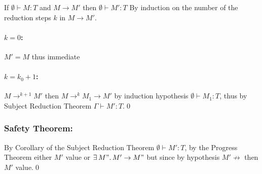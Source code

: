 If $\emptyset \vdash M: T$ and $M \to M'$ then $\emptyset \vdash M': T$
By induction on the number of the reduction steps $k$ in $M \to M'$.

\paragraph*{$k = 0$:} $M' = M$ thus immediate
\paragraph*{$k = k_0 + 1$:\\}
$M \to^{k+1} M'$ then $M \to^k M_1 \to M'$ by induction hypothesis $\emptyset \vdash M_1: T$,
thus by Subject Reduction Theorem $\Gamma \vdash M': T$.\qed

\subsubsection*{Safety Theorem:}

By Corollary of the Subject Reduction Theorem $\emptyset \vdash M': T$, by the Progress Theorem
either $M'$ value or $\exists\, M".\, M' \to M"$ but since by hypothesis $M' \not\to$ then
$M'$ value.\qed
